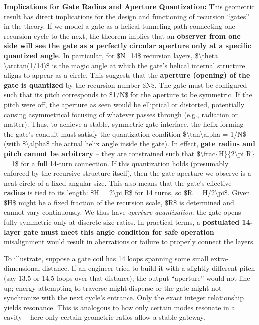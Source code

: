 \documentclass[]{article}
\begin{document}
\textbf{Implications for Gate Radius and Aperture Quantization:} This
geometric result has direct implications for the design and functioning
of recursion ``gates'' in the theory. If we model a gate as a helical
tunneling path connecting one recursion cycle to the next, the theorem
implies that an \textbf{observer from one side will see the gate as a
perfectly circular aperture only at a specific quantized angle}. In
particular, for \$N=14\$ recursion layers, \$\textbackslash{}theta =
\textbackslash{}arctan(1/14)\$ is the magic angle at which the gate's
helical internal structure aligns to appear as a circle. This suggests
that the \textbf{aperture (opening) of the gate is quantized} by the
recursion number \$N\$. The gate must be configured such that its pitch
corresponds to \$1/N\$ for the aperture to be symmetric. If the pitch
were off, the aperture as seen would be elliptical or distorted,
potentially causing asymmetrical focusing of whatever passes through
(e.g., radiation or matter). Thus, to achieve a stable, symmetric gate
interface, the helix forming the gate's conduit must satisfy the
quantization condition \$\textbackslash{}tan\textbackslash{}alpha =
1/N\$ (with \$\textbackslash{}alpha\$ the actual helix angle inside the
gate). In effect, \textbf{gate radius and pitch cannot be arbitrary} --
they are constrained such that
\$\textbackslash{}frac\{H\}\{2\textbackslash{}pi R\} = 1\$ for a full
14-turn connection. If this quantization holds (presumably enforced by
the recursive structure itself), then the gate aperture we observe is a
neat circle of a fixed angular size. This also means that the gate's
effective \textbf{radius} is tied to its length: \$H =
2\textbackslash{}pi R\$ for 14 turns, so \$R = H/2\textbackslash{}pi\$.
Given \$H\$ might be a fixed fraction of the recursion scale, \$R\$ is
determined and cannot vary continuously. We thus have \emph{aperture
quantization}: the gate opens fully symmetric only at discrete size
ratios. In practical terms, a \textbf{postulated 14-layer gate must meet
this angle condition for safe operation} -- misalignment would result in
aberrations or failure to properly connect the layers.

To illustrate, suppose a gate coil has 14 loops spanning some small
extra-dimensional distance. If an engineer tried to build it with a
slightly different pitch (say 13.5 or 14.5 loops over that distance),
the output ``aperture'' would not line up; energy attempting to traverse
might disperse or the gate might not synchronize with the next cycle's
entrance. Only the exact integer relationship yields resonance. This is
analogous to how only certain modes resonate in a cavity -- here only
certain geometric ratios allow a stable gateway.
\end{document}
